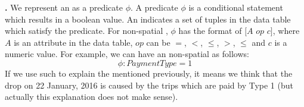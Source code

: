 



{\bf {\Explanation}.} We represent an {\explanation} as a predicate $\phi$. 
A predicate $\phi$ is a conditional statement which results in a boolean value. An {\explanation} indicates a set of tuples in the data table which satisfy the predicate. For non-spatial {\explanation}, $\phi$ has the format of $[A$ $op$ $c]$, where $A$ is an attribute in the data table, $op$ can be $=$, $<$, $\leq$, $>$, $\leq$ and $c$ is a numeric value. For example, we can have an non-spatial {\explanation} as follows:
$$\phi: PaymentType = 1$$
If we use such {\explanation} to explain the {\fact} mentioned previously, it means we think that the drop on 22 January, 2016 is caused by the trips which are paid by Type 1 (but actually this explanation does not make sense).

%
%

